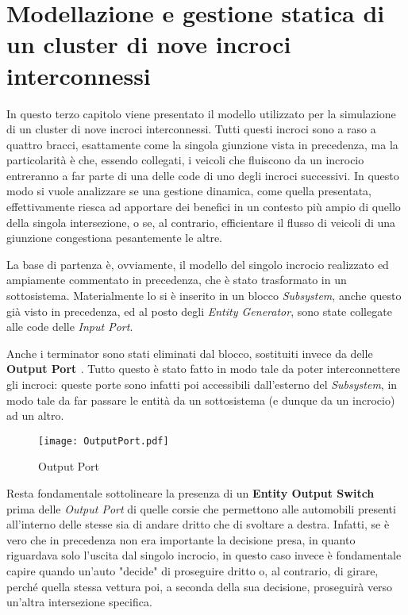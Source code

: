 \chapter{Modellazione e gestione statica di un cluster di nove incroci interconnessi}
In questo terzo capitolo viene presentato il modello utilizzato per la simulazione di un cluster di nove incroci interconnessi. Tutti questi incroci sono a raso a quattro bracci, esattamente come la singola giunzione vista in precedenza, ma la particolarità è che, essendo collegati, i veicoli che fluiscono da un incrocio entreranno a far parte di una delle code di uno degli incroci successivi. In questo modo si vuole analizzare se una gestione dinamica, come quella presentata, effettivamente riesca ad apportare dei benefici in un contesto più ampio di quello della singola intersezione, o se, al contrario, efficientare il flusso di veicoli di una giunzione congestiona pesantemente le altre.

La base di partenza è, ovviamente, il modello del singolo incrocio realizzato ed ampiamente commentato in precedenza, che è stato trasformato in un sottosistema. Materialmente lo si è inserito in un blocco \textit{Subsystem}\cite{subsystem}, anche questo già visto in precedenza, ed al posto degli \textit{Entity Generator}, sono state collegate alle code delle \textit{Input Port}.

Anche i terminator sono stati eliminati dal blocco, sostituiti invece da delle \textbf{Output Port \cite{outputport}}. Tutto questo è stato fatto in modo tale da poter interconnettere gli incroci: queste porte sono infatti poi accessibili dall'esterno del \textit{Subsystem}, in modo tale da far passare le entità da un sottosistema (e dunque da un incrocio) ad un altro.

\begin{figure}[H]
\centering
  \texttt{[image: OutputPort.pdf]}
  \caption{Output Port}
  \label{fig:}
\end{figure}

Resta fondamentale sottolineare la presenza di un \textbf{Entity Output Switch \cite{switch}} prima delle \textit{Output Port} di quelle corsie che permettono alle automobili presenti all'interno delle stesse sia di andare dritto che di svoltare a destra. Infatti, se è vero che in precedenza non era importante la decisione presa, in quanto riguardava solo l'uscita dal singolo incrocio, in questo caso invece è fondamentale capire quando un'auto "decide" di proseguire dritto o, al contrario, di girare, perché quella stessa vettura poi, a seconda della sua decisione, proseguirà verso un'altra intersezione specifica. 

